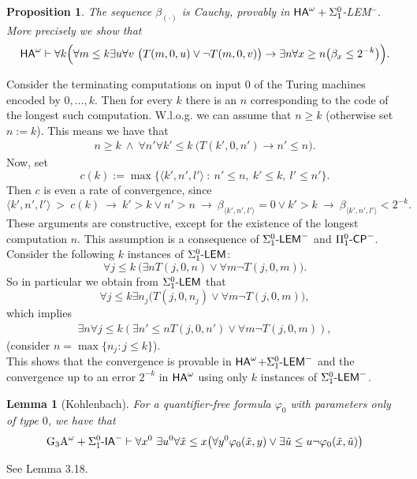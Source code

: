 \documentclass[1p]{elsarticle}
\newcommand{\usftext}[1]{\textsf{\upshape #1}}
\newcommand{\ha}{\ensuremath{{\usftext{HA}}^\omega}} %
\newcommand{\IA}{\ensuremath{\usftext{IA}}} %
\newcommand{\LEM}{\ensuremath{\Sigma^0_1\usftext{-LEM}}}
\newcommand{\CP}{\ensuremath{\usftext{CP}}}
\newcommand{\SiLm}{\ensuremath{\Sigma^0_1\usftext{-}}}
\newcommand{\m}{\ensuremath{\usftext{-}}}
\theoremstyle{plain}
\newtheorem{lemma}[thm]{Lemma}
\newtheorem{prop}[thm]{Proposition}
\theoremstyle{definition}
\theoremstyle{remark}
\renewenvironment{proof}[1][]{\noindent{\bf Proof{#1}. }}{\nopagebreak[4]{\hspace*{\fill}
  $\Box$              %
 }{\vspace{2ex}}}
\renewcommand{\phi}{\varphi}
\theoremstyle{definition}
\begin{document}
{\begin{prop}\label{p:alphaIsCauchy}
The sequence $\beta_{(\cdot)}$ is Cauchy, provably in 
{\rm $\ha+\Sigma^0_1$-LEM$^-$}. More precisely we show that
\[ 
\ha
\vdash 
\forall k \Big( 
\forall m\leq k \exists u \forall v\ \big(T(m,0,u) \vee \neg T(m,0,v)\big)\rightarrow \exists n \forall x\geq n\big(\beta_x\leq2^{-k}\big)\Big).
 \]
\end{prop}
\begin{proof}
Consider the terminating computations on input $0$ of the Turing machines encoded by $0,\ldots,k$. Then for every $k$ there is an $n$ corresponding to the
code of the longest such computation. W.l.o.g. we can assume that $n\geq k$ (otherwise set $n:=k$). This means we have that
\begin{align}
n\geq k\ \wedge\ \forall n'\forall k'\leq k\ \big( T(k',0,n')\rightarrow n'\leq n\big).\label{e:ac-n}
\end{align}
Now, set \[ c(k):=\max\{ \langle k',n',l' \rangle\ :\ n'\leq n,\ k'\leq k,\ l'\leq n'\}.\]
Then $c$ is even a rate of convergence, since
\[
\langle k',n',l'\rangle\ >\ c(k)\ \rightarrow\ k'>k \vee n'>n\ 
\rightarrow\ \beta_{\langle k',n',l'\rangle}=0 \vee k'>k\ \rightarrow\ \beta_{\langle k',n',l'\rangle} < 2^{-k}.
\]
These arguments are constructive, except for the existence of the longest computation $n$.
This assumption is a consequence of $\LEM^-$ and $\Pi^0_1\m\CP^-$.
Consider the following $k$ instances of $\LEM$:
\[ \forall j\leq k\ \big( \exists n T(j,0,n) \vee \forall m \neg T(j,0,m)\big). \]
So in particular we obtain from $\LEM$ that
\[ \forall j\leq k \exists n_j \big( T(j,0,n_j) \vee \forall m \neg T(j,0,m)\big), \]
which implies
\begin{align*}
\exists n\forall j\leq k ( \exists n'\leq n T(j,0,n') \vee \forall m \neg T(j,0,m) ),
\end{align*}
 (consider $n=\max \{n_j : j\leq k\}$).\\
This shows that the convergence is provable in $\ha$+$\LEM^-$ and the convergence up to an error $2^{-k}$ in $\ha$ using
only $k$ instances of $\LEM^-$.
\end{proof}



\begin{lemma}[Kohlenbach]\label{l:G3ACP}
For a quantifier-free formula $\phi_0$ with parameters only of type $0$, we have that
\[
\mbox{\rm G$_3$A}^\omega + 
\SiLm\IA^- \vdash 
\forall x^0\ \exists u^0 
\forall\tilde x\leq x \big(  
\forall y^0 \phi_0(\tilde x,y)
\vee\exists\tilde u\leq u\neg\phi_0(\tilde x,\tilde u) \big)
\]
\end{lemma}
\begin{proof}
See \cite{Kohlenbach(book)} Lemma 3.18.
\end{proof}

}
\end{document}
